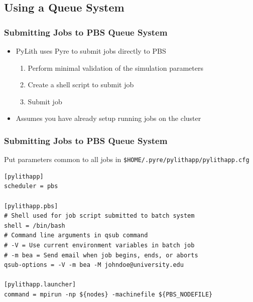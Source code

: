 \documentclass{beamer}
\begin{document}
\subsection{Using a Queue System}

\begin{frame}
  \frametitle{Submitting Jobs to PBS Queue System}

  \begin{itemize}
    \item PyLith uses Pyre to submit jobs directly to PBS
    \begin{enumerate}
    \item Perform minimal validation of the simulation parameters
    \item Create a shell script to submit job
    \item Submit job
    \end{enumerate}
  \item Assumes you have already setup running jobs on the cluster
  \end{itemize}
  
\end{frame}


\begin{frame}[fragile]
  \frametitle{Submitting Jobs to PBS Queue System}
  \summary{}

  Put parameters common to all jobs in {\tt \$HOME/.pyre/pylithapp/pylithapp.cfg}

{\small
\begin{verbatim}
[pylithapp]
scheduler = pbs

[pylithapp.pbs]
# Shell used for job script submitted to batch system
shell = /bin/bash
# Command line arguments in qsub command
# -V = Use current environment variables in batch job
# -m bea = Send email when job begins, ends, or aborts
qsub-options = -V -m bea -M johndoe@university.edu

[pylithapp.launcher]
command = mpirun -np ${nodes} -machinefile ${PBS_NODEFILE}
  \end{verbatim}}
\end{frame}
\end{document}
